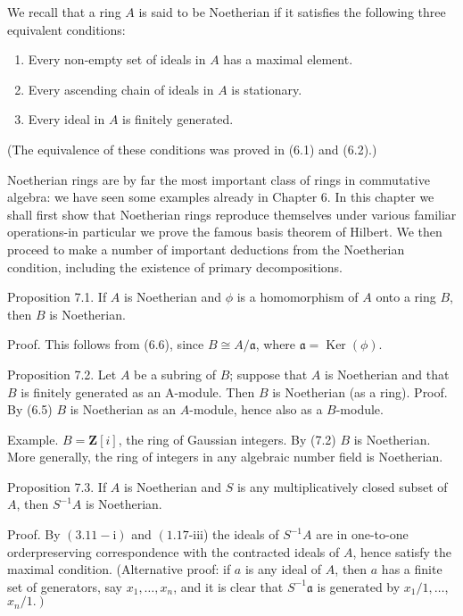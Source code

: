 \documentclass{standalone}
\theoremstyle{definition}
\theoremstyle{remark}
\begin{document}
We recall that a ring $A$ is said to be Noetherian if it satisfies the following three equivalent conditions:

\begin{enumerate}
  \item Every non-empty set of ideals in $A$ has a maximal element.

  \item Every ascending chain of ideals in $A$ is stationary.

  \item Every ideal in $A$ is finitely generated.

\end{enumerate}

(The equivalence of these conditions was proved in (6.1) and (6.2).)

Noetherian rings are by far the most important class of rings in commutative algebra: we have seen some examples already in Chapter 6. In this chapter we shall first show that Noetherian rings reproduce themselves under various familiar operations-in particular we prove the famous basis theorem of Hilbert. We then proceed to make a number of important deductions from the Noetherian condition, including the existence of primary decompositions.

Proposition 7.1. If $A$ is Noetherian and $\phi$ is a homomorphism of $A$ onto a ring $B$, then $B$ is Noetherian.

Proof. This follows from (6.6), since $B \cong A / \mathfrak{a}$, where $\mathfrak{a}=\operatorname{Ker}(\phi)$.

Proposition 7.2. Let $A$ be a subring of $B$; suppose that $A$ is Noetherian and that $B$ is finitely generated as an A-module. Then $B$ is Noetherian (as a ring). Proof. By (6.5) $B$ is Noetherian as an $A$-module, hence also as a $B$-module.

Example. $B=\mathbf{Z}[i]$, the ring of Gaussian integers. By (7.2) $B$ is Noetherian. More generally, the ring of integers in any algebraic number field is Noetherian.

Proposition 7.3. If $A$ is Noetherian and $S$ is any multiplicatively closed subset of $A$, then $S^{-1} A$ is Noetherian.

Proof. By $(3.11-\mathrm{i})$ and $\left(1.17\right.$-iii) the ideals of $S^{-1} A$ are in one-to-one orderpreserving correspondence with the contracted ideals of $A$, hence satisfy the maximal condition. (Alternative proof: if $a$ is any ideal of $A$, then $a$ has a finite set of generators, say $x_{1}, \ldots, x_{n}$, and it is clear that $S^{-1} \mathfrak{a}$ is generated by $x_{1} / 1, \ldots$, $\left.x_{n} / 1.\right)$
\end{document}

